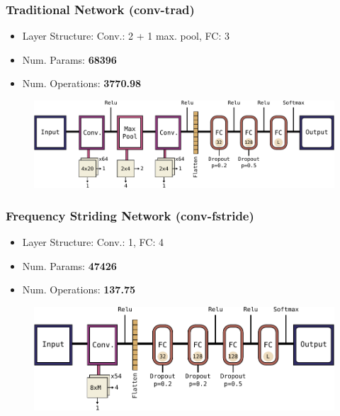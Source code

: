 \begin{frame}
  \frametitle{Traditional Network (conv-trad)}
  \begin{itemize}
    \item Layer Structure: Conv.: 2 + 1 max. pool, FC: 3 
    \item Num. Params: \textbf{\num{68396}}
    \item Num. Operations: \textbf{\SI{3770.98}{\kilo\ops}}
  \end{itemize}
  \begin{figure} \includegraphics[height=0.35\textheight]{../4_nn/figs/nn_arch_cnn_trad.pdf} \end{figure}
\end{frame}

\begin{frame}
  \frametitle{Frequency Striding Network (conv-fstride)}
  \begin{itemize}
    \item Layer Structure: Conv.: 1, FC: 4
    \item Num. Params: \textbf{\num{47426}} 
    \item Num. Operations: \textbf{\SI{137.75}{\kilo\ops}}
  \end{itemize}
  \begin{figure} \includegraphics[height=0.35\textheight]{../4_nn/figs/nn_arch_cnn_fstride.pdf} \end{figure}
\end{frame}

